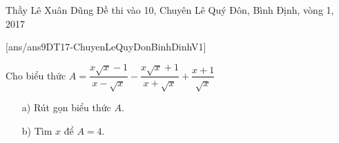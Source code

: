 \begin{name}
{Thầy  Lê Xuân Dũng}
{Đề thi vào 10, Chuyên Lê Quý Đôn, Bình Định, vòng 1, 2017}
\end{name}
\setcounter{ex}{0}
[ans/ans9DT17-ChuyenLeQuyDonBinhDinhV1]
\begin{ex}%
Cho biểu thức $A = \dfrac{x\sqrt{x}-1}{x-\sqrt{x}}-\dfrac{x\sqrt{x}+1}{x+\sqrt{x}}+\dfrac{x+1}{\sqrt{x}}$
\begin{itemize}
\item[a)]  Rút gọn biểu thức $A.$
\item [b)]  Tìm $x$ để $A = 4.$
\end{itemize}

\end{ex}

